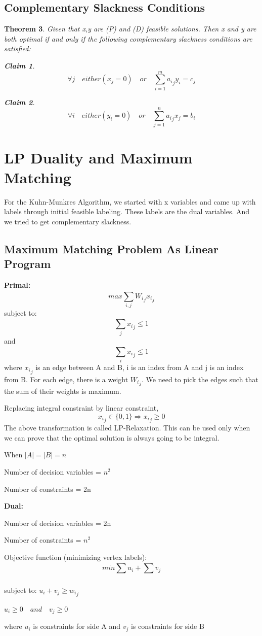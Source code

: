 \documentclass[twoside]{article}
\newcounter{lecnum}
\newtheorem{theorem}{Theorem}[lecnum]
\newtheorem{claim}[theorem]{Claim}
\begin{document}
\subsection{Complementary Slackness Conditions}
\begin{theorem}
Given that x,y are (P) and (D) feasible solutions. Then x and y are both optimal if and only if the following complementary slackness conditions are satisfied:
\begin{claim}
$$\forall j \quad either (x_j=0) \quad or \quad \sum_{i=1}^{m} {a_i}_j y_i = c_j$$
\end{claim}
\begin{claim}
$$\forall i \quad either (y_i=0) \quad or \quad \sum_{j=1}^{n} {a_i}_j x_j = b_i$$
\end{claim}
\end{theorem}

\section{LP Duality and Maximum Matching}
For the Kuhn-Munkres Algorithm, we started with x variables and came up with labels through initial feasible labeling. These labels are the dual variables. And we tried to get complementary slackness.

\subsection{Maximum Matching Problem As Linear Program}
\textbf{Primal:}
$$max \sum_{i,j}^{} {W_i}_j {x_i}_j$$
subject to:
$$\sum_{j}^{} {x_i}_j \leq 1$$ and $$\sum_{i}^{} {x_i}_j \leq 1$$
where ${x_i}_j$ is an edge between A and B, i is an index from A and j is an index from B. For each edge, there is a weight ${W_i}_j$. We need to pick the edges such that the sum of their weights is maximum.

Replacing integral constraint by linear constraint,
$${x_i}_j \in \big\{0, 1\big\} \Rightarrow {x_i}_j \geq 0$$
The above transformation is called LP-Relaxation. This can be used only when we can prove that the optimal solution is always going to be integral.

When $|A| = |B| = n$

Number of decision variables = $n^2$

Number of constraints = 2n

\textbf{Dual:}

Number of decision variables = 2n

Number of constraints = $n^2$

Objective function (minimizing vertex labels): $$min \sum_{}^{} u_i + \sum_{}^{} v_j$$

subject to: 
$u_i + v_j \geq {w_i}_j$

$u_i \geq 0 \quad and \quad v_j \geq 0$

where $u_i$ is constraints for side A and $v_j$ is constraints for side B
\end{document}
